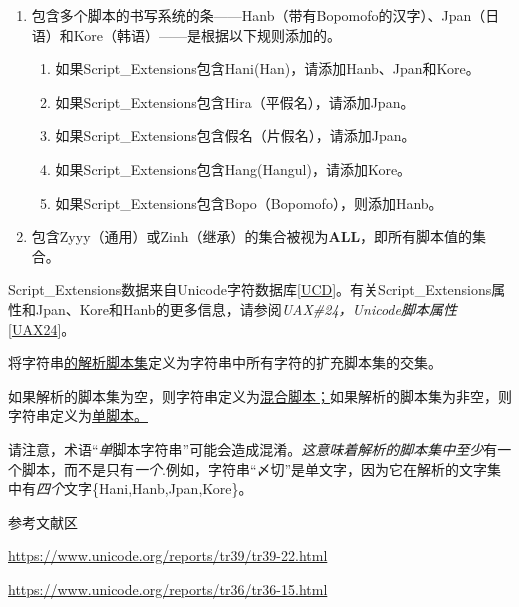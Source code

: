 \documentclass[
]{article}
\begin{document}
\begin{enumerate}
\def\labelenumi{\arabic{enumi}.}
\item
  包含多个脚本的书写系统的条------Hanb（带有Bopomofo的汉字）、Jpan（日语）和Kore（韩语）------是根据以下规则添加的。

  \begin{enumerate}
  \def\labelenumii{\arabic{enumii}.}
  \item
    如果Script\_Extensions包含Hani(Han)，请添加Hanb、Jpan和Kore。
  \item
    如果Script\_Extensions包含Hira（平假名），请添加Jpan。
  \item
    如果Script\_Extensions包含假名（片假名），请添加Jpan。
  \item
    如果Script\_Extensions包含Hang(Hangul)，请添加Kore。
  \item
    如果Script\_Extensions包含Bopo（Bopomofo），则添加Hanb。
  \end{enumerate}
\item
  包含Zyyy（通用）或Zinh（继承）的集合被视为\textbf{ALL}，即所有脚本值的集合。
\end{enumerate}

Script\_Extensions数据来自Unicode字符数据库{[}\href{https://www-unicode-org.translate.goog/reports/tr39/tr39-22.html?_x_tr_sl=auto\&_x_tr_tl=zh-CN\&_x_tr_hl=zh-CN\#UCD}{UCD}{]}。有关Script\_Extensions属性和Jpan、Kore和Hanb的更多信息，请参阅\emph{UAX\#24，Unicode脚本属性}{[}\href{https://www-unicode-org.translate.goog/reports/tr39/tr39-22.html?_x_tr_sl=auto\&_x_tr_tl=zh-CN\&_x_tr_hl=zh-CN\#UAX24}{UAX24}{]}。

将字符串\href{https://www-unicode-org.translate.goog/reports/tr39/tr39-22.html?_x_tr_sl=auto\&_x_tr_tl=zh-CN\&_x_tr_hl=zh-CN\#def-resolved-script-set}{的解析脚本集}定义为字符串中所有字符的扩充脚本集的交集。

如果解析的脚本集为空，则字符串定义为\href{https://www-unicode-org.translate.goog/reports/tr39/tr39-22.html?_x_tr_sl=auto\&_x_tr_tl=zh-CN\&_x_tr_hl=zh-CN\#def-mixed-script}{混合脚本；}如果解析的脚本集为非空，则字符串定义为\href{https://www-unicode-org.translate.goog/reports/tr39/tr39-22.html?_x_tr_sl=auto\&_x_tr_tl=zh-CN\&_x_tr_hl=zh-CN\#def-single-script}{单脚本。}

请注意，术语``\emph{单}脚本字符串''可能会造成混淆。\emph{这意味着解析的脚本集中至少}有一个脚本，而不是只有\emph{一个}.例如，字符串``〆切''是单文字，因为它在解析的文字集中有\emph{四个}文字\{Hani,Hanb,Jpan,Kore\}。

参考文献区

\url{https://www.unicode.org/reports/tr39/tr39-22.html}

\url{https://www.unicode.org/reports/tr36/tr36-15.html}
\end{document}

